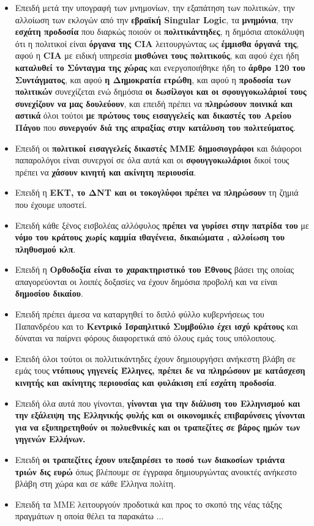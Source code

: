 \documentclass[a4paper]{article}
\begin{document}
\begin{itemize}

\item Επειδή μετά την υπογραφή των μνημονίων, την εξαπάτηση των πολιτικών, την αλλοίωση των εκλογών από την \textbf{εβραϊκή Singular Logic}, τα \textbf{μνημόνια}, την \textbf{εσχάτη προδοσία} που διαρκώς ποιούν οι \textbf{πολιτικάντηδες}, η δημόσια αποκάλυψη ότι η πολιτικοί είναι \textbf{όργανα της CIA} λειτουργώντας ως \textbf{έμμισθα όργανά της}, αφού η \textbf{CIA} με ειδική υπηρεσία \textbf{μισθώνει τους πολιτικούς}, και αφού έχει ήδη \textbf{καταλυθεί το Σύνταγμα της χώρας} και ενεργοποιήθηκε ήδη το \textbf{άρθρο 120 του Συντάγματος}, και αφού \textbf{η Δημοκρατία ετρώθη}, και αφού η \textbf{προδοσία των πολιτικών} συνεχίζεται ενώ δημόσια \textbf{οι δωσίλογοι και οι σφουγγοκωλάριοί τους συνεχίζουν να μας δουλεύουν}, και επειδή πρέπει να \textbf{πληρώσουν ποινικά και αστικά} όλοι τούτοι \textbf{με πρώτους τους εισαγγελείς και δικαστές του Αρείου Πάγου} που \textbf{συνεργούν διά της απραξίας στην κατάλυση του πολιτεύματος}.
\item Επειδή οι \textbf{πολιτικοί εισαγγελείς δικαστές ΜΜΕ δημοσιογράφοι} και διάφοροι παπαρολόγοι είναι συνεργοί σε όλα αυτά και οι \textbf{σφουγγοκωλάριοι} δικοί τους πρέπει να \textbf{χάσουν κινητή και ακίνητη περιουσία}.
\item Επειδή η \textbf{ΕΚΤ, το ΔΝΤ και οι τοκογλύφοι} \textbf{πρέπει να πληρώσουν} τη ζημιά που έχουμε υποστεί.
\item Επειδή κάθε ξένος εισβολέας αλλόφυλος \textbf{πρέπει να γυρίσει στην πατρίδα του} με \textbf{νόμο του κράτους χωρίς καμμία ιθαγένεια, δικαιώματα , αλλοίωση του πληθυσμού κλπ}.
\item Επειδή η \textbf{Ορθοδοξία είναι το χαρακτηριστικό του Έθνους} βάσει της οποίας απαγορεύονται οι λοιπές δοξασίες να έχουν δημόσια προβολή και να είναι \textbf{δημοσίου δικαίου}.
\item Επειδή πρέπει άμεσα να καταργηθεί το διπλό φύλλο κυβερνήσεως του Παπανδρέου και το \textbf{Κεντρικό Ισραηλιτικό Συμβούλιο έχει ισχύ κράτους} και δύναται να παίρνει φόρους διαφορετικά από όλους εμάς τους υπόλοιπους.\par
\item Επειδή όλοι τούτοι οι πολλιτικάντηδες έχουν δημιουργήσει ανήκεστη βλάβη σε εμάς τους \textbf{ντόπιους γηγενείς Έλληνες, πρέπει δε να πληρώσουν με κατάσχεση κινητής και ακίνητης περιουσίας και φυλάκιση επί εσχάτη προδοσία}.\par
\item Επειδή όλα αυτά που γίνονται, \textbf{γίνονται για την διάλυση του Ελληνισμού και την εξάλειψη της Ελληνικής φυλής και οι οικονομικές επιβαρύνσεις γίνονται για να εξυπηρετηθούν οι πολυεθνικές και οι τραπεζίτες σε βάρος ημών των γηγενών Ελλήνων.}\par
\item Επειδή \textbf{οι τραπεζίτες έχουν υπεξαιρέσει το ποσό των διακοσίων τριάντα τριών δις ευρώ} όπως βλέπουμε σε έγγραφα δημιουργώντας ανοικτές ανήκεστο βλάβη στη χώρα και σε κάθε Έλληνα πολίτη.
\item Επειδή τα ΜΜΕ λειτουργούν προδοτικά και προς το σκοπό της νέας τάξης πραγμάτων η οποία θέλει τα παρακάτω ...


\end{itemize}
\end{document}
